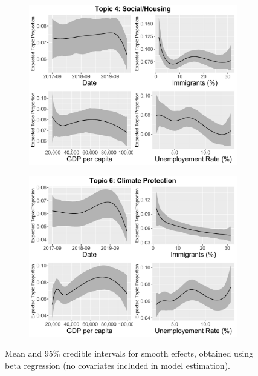 \begin{figure}[h!]
  \centering
  \begin{subfigure}[b]{0.4\linewidth}
    \includegraphics[width=\linewidth]{../plots/appendix/6_1/beta_t4_cont_ctm.pdf}
  \end{subfigure}
  \begin{subfigure}[b]{0.4\linewidth}
    \includegraphics[width=\linewidth]{../plots/appendix/6_1/beta_t6_cont_ctm.pdf}
  \end{subfigure}
  \caption{Mean and 95\% credible intervals for smooth effects, obtained using beta regression (no covariates included in model estimation).}
  \label{fig:beta_t46_cont_ctm}
\end{figure}

